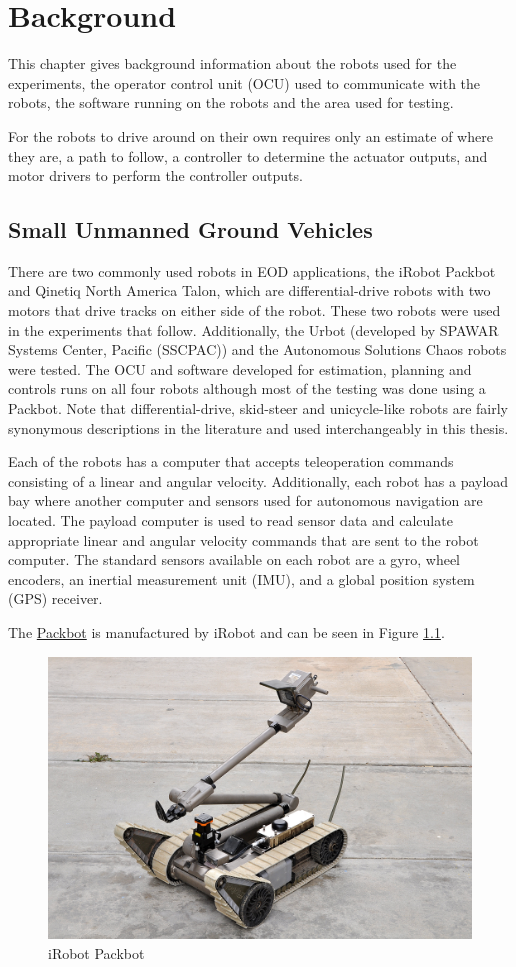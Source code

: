 \chapter{Background}
\label{ch:background}
This chapter gives background information about the robots used for the experiments, the operator control unit (OCU) used to communicate with the robots, the software running on the robots and the area used for testing.

For the robots to drive around on their own requires only an estimate of where they are, a path to follow, a controller to determine the actuator outputs, and motor drivers to perform the controller outputs.

\section{Small Unmanned Ground Vehicles}
\label{sec:smallugvs}
There are two commonly used robots in EOD applications, the iRobot Packbot and Qinetiq North America Talon, which are differential-drive robots with two motors that drive tracks on either side of the robot. These two robots were used in the experiments that follow. Additionally, the Urbot (developed by SPAWAR Systems Center, Pacific (SSCPAC)) and the Autonomous Solutions Chaos robots were tested. The OCU and software developed for estimation, planning and controls runs on all four robots although most of the testing was done using a Packbot. Note that differential-drive, skid-steer and unicycle-like robots are fairly synonymous descriptions in the literature and used interchangeably in this thesis.

Each of the robots has a computer that accepts teleoperation commands consisting of a linear and angular velocity. Additionally, each robot has a payload bay where another computer and sensors used for autonomous navigation are located. The payload computer is used to read sensor data and calculate appropriate linear and angular velocity commands that are sent to the robot computer. The standard sensors available on each robot are a gyro, wheel encoders, an inertial measurement unit (IMU), and a global position system (GPS) receiver.

The \href{http://www.irobot.com/sp.cfm?pageid=171}{Packbot} is manufactured by iRobot and can be seen in Figure \ref{fig:packbot}.

\begin{figure}[ht!]
	\centering
	\includegraphics[width=.3\textwidth]{images/packbotRetrotraverse}
	\caption{iRobot Packbot}
	\label{fig:packbot}
\end{figure}

